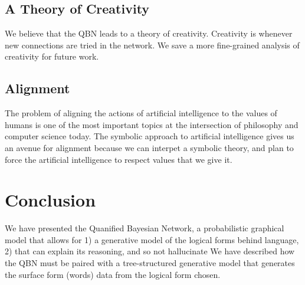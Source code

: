 \documentclass[12pt]{article}
\begin{document}
\subsection{A Theory of Creativity}
We believe that the QBN leads to a theory of creativity.
Creativity is whenever new connections are tried in the network.
We save a more fine-grained analysis of creativity for future work.
\subsection{Alignment}
The problem of aligning the actions of artificial intelligence to the values of humans is one of the most important topics at the intersection of philosophy and computer science today.
The symbolic approach to artificial intelligence gives us an avenue for alignment because we can interpet a symbolic theory, and plan to force the artificial intelligence to respect values that we give it.
\section{Conclusion}
We have presented the Quanified Bayesian Network, a probabilistic graphical model that allows for 1) a generative model of the logical forms behind language, 2) that can explain its reasoning, and so not hallucinate
We have described how the QBN must be paired with a tree-structured generative model that generates the surface form (words) data from the logical form chosen.



\end{document}
